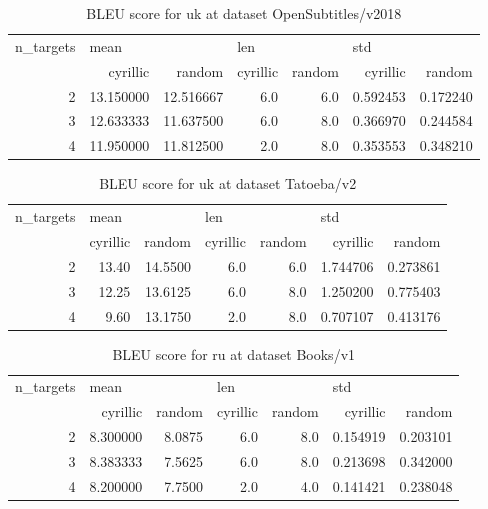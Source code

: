 \begin{table}[h]
\begin{tabular}{rrrrrrr}
\toprule
n\_targets & \multicolumn{2}{l}{mean} & \multicolumn{2}{l}{len} & \multicolumn{2}{l}{std} \\
          &   cyrillic &     random & cyrillic & random &  cyrillic &    random \\
\midrule
        2 &  13.150000 &  12.516667 &      6.0 &    6.0 &  0.592453 &  0.172240 \\
        3 &  12.633333 &  11.637500 &      6.0 &    8.0 &  0.366970 &  0.244584 \\
        4 &  11.950000 &  11.812500 &      2.0 &    8.0 &  0.353553 &  0.348210 \\
\bottomrule
\end{tabular}

\caption{BLEU score for  uk at dataset OpenSubtitles/v2018 }
\label{ table:uk/OpenSubtitles/v2018 }
\end{table}

\begin{table}[h]
\begin{tabular}{rrrrrrr}
\toprule
n\_targets & \multicolumn{2}{l}{mean} & \multicolumn{2}{l}{len} & \multicolumn{2}{l}{std} \\
          & cyrillic &   random & cyrillic & random &  cyrillic &    random \\
\midrule
        2 &    13.40 &  14.5500 &      6.0 &    6.0 &  1.744706 &  0.273861 \\
        3 &    12.25 &  13.6125 &      6.0 &    8.0 &  1.250200 &  0.775403 \\
        4 &     9.60 &  13.1750 &      2.0 &    8.0 &  0.707107 &  0.413176 \\
\bottomrule
\end{tabular}

\caption{BLEU score for  uk at dataset Tatoeba/v2 }
\label{ table:uk/Tatoeba/v2 }
\end{table}

\begin{table}[h]
\begin{tabular}{rrrrrrr}
\toprule
n\_targets & \multicolumn{2}{l}{mean} & \multicolumn{2}{l}{len} & \multicolumn{2}{l}{std} \\
          &  cyrillic &  random & cyrillic & random &  cyrillic &    random \\
\midrule
        2 &  8.300000 &  8.0875 &      6.0 &    8.0 &  0.154919 &  0.203101 \\
        3 &  8.383333 &  7.5625 &      6.0 &    8.0 &  0.213698 &  0.342000 \\
        4 &  8.200000 &  7.7500 &      2.0 &    4.0 &  0.141421 &  0.238048 \\
\bottomrule
\end{tabular}

\caption{BLEU score for  ru at dataset Books/v1 }
\label{ table:ru/Books/v1 }
\end{table}

